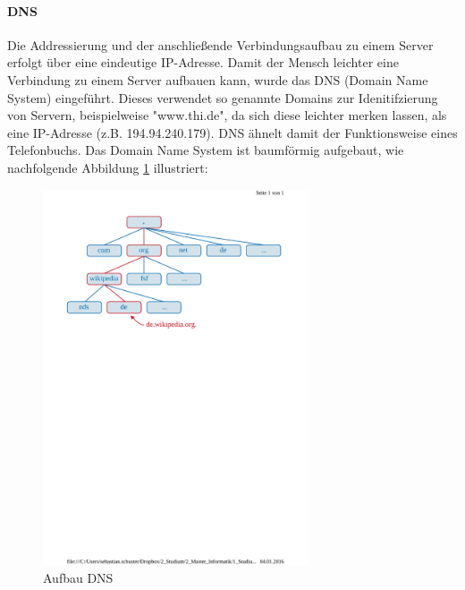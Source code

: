 \paragraph*{DNS}
Die Addressierung und der anschließende Verbindungsaufbau zu einem Server erfolgt über eine eindeutige IP-Adresse. Damit der Mensch leichter eine Verbindung zu einem Server aufbauen kann,
wurde das DNS (Domain Name System) eingeführt. Dieses verwendet so genannte Domains zur Idenitifzierung von Servern, beispielweise "www.thi.de", da sich diese leichter merken lassen, als
eine IP-Adresse (z.B. 194.94.240.179). DNS ähnelt damit der Funktionsweise eines Telefonbuchs.
Das Domain Name System ist baumförmig aufgebaut, wie nachfolgende Abbildung \ref{fig:dns} illustriert: \\
\begin{figure}[h!]
	\centering
	\includegraphics[width=0.7\textwidth]{bilder/dns.pdf}
	\caption{Aufbau DNS \cite{dnspicture}}
	\label{fig:dns}
\end{figure}



